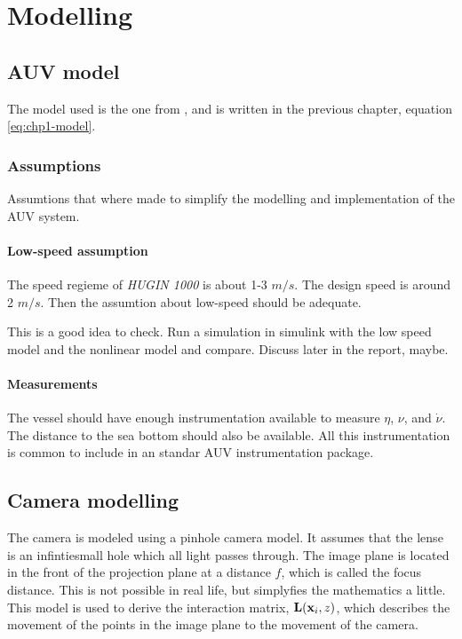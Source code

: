 \chapter{Modelling}


\section{AUV model}
	The model used is the one from \cite{fossen}, and is written in the previous chapter, equation \eqref{eq:chp1-model}.
	
	\subsection{Assumptions}
	Assumtions that where made to simplify the modelling and implementation of the AUV system.
		\subsubsection{Low-speed assumption}
		The speed regieme of \textit{HUGIN 1000} is about 1-3 $m/s$. The design speed is around 2 $m/s$. Then the assumtion about low-speed should be adequate.  

		This is a good idea to check. Run a simulation in simulink with the low speed model and the nonlinear model and compare. Discuss later in the report, maybe.
		
		\subsubsection{Measurements}
		The vessel should have enough instrumentation available to measure $\eta$, $\nu$, and $\dot{\nu}$. The distance to the sea bottom should also be available. All this instrumentation is common to include in an standar AUV instrumentation package. 


\section{Camera modelling}
	The camera is modeled using a pinhole camera model. It assumes that the lense is an infintiesmall hole which all light passes through. The image plane is located in the front of the projection plane at a distance $f$, which is called the focus distance. This is not possible in real life, but simplyfies the mathematics a little. This model is used to derive the interaction matrix, $\mathbf{L}(\mathbf{x}_i, z)$, which describes the movement of the points in the image plane to the movement of the camera.\cite{robotbok} 

